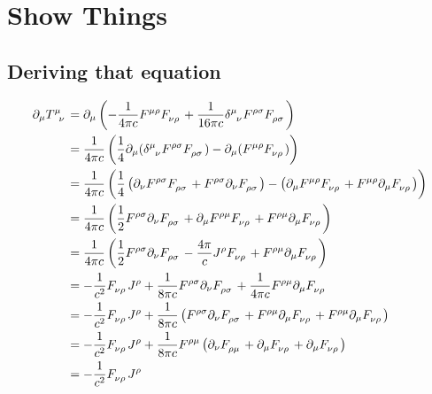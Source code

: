 \clearpage
\section{Show Things}
\subsection{Deriving that equation}

\begin{align}
	\partial_\mu\tensor{T}{^\mu_\nu} &= \partial_\mu\ins{-\frac{1}{4\pi c}\tensor{F}{^\mu^\rho}\tensor{F}{_\nu_\rho}+\frac{1}{16\pi c}\tensor{\delta}{^\mu_\nu}\tensor{F}{^\rho^\sigma}\tensor{F}{_\rho_\sigma}}\\
	&= \frac{1}{4\pi c}\ins{\frac{1}{4}\partial_\mu(\tensor{\delta}{^\mu_\nu}\tensor{F}{^\rho^\sigma}\tensor{F}{_\rho_\sigma})-\partial_\mu(\tensor{F}{^\mu^\rho}\tensor{F}{_\nu_\rho})}\\
	&= \frac{1}{4\pi c}\ins{\frac{1}{4}\ins{\partial_\nu\tensor{F}{^\rho^\sigma}\tensor{F}{_\rho_\sigma}+\tensor{F}{^\rho^\sigma}\partial_\nu\tensor{F}{_\rho_\sigma}}-\ins{\partial_\mu\tensor{F}{^\mu^\rho}\tensor{F}{_\nu_\rho}+\tensor{F}{^\mu^\rho}\partial_\mu\tensor{F}{_\nu_\rho}}}\\
	&= \frac{1}{4\pi c}\ins{\frac{1}{2}\tensor{F}{^\rho^\sigma}\partial_\nu\tensor{F}{_\rho_\sigma}+\partial_\mu\tensor{F}{^\rho^\mu}\tensor{F}{_\nu_\rho}+\tensor{F}{^\rho^\mu}\partial_\mu\tensor{F}{_\nu_\rho}}\\
	&= \frac{1}{4\pi c}\ins{\frac{1}{2}\tensor{F}{^\rho^\sigma}\partial_\nu\tensor{F}{_\rho_\sigma}-\frac{4\pi}{c}J^\rho\tensor{F}{_\nu_\rho}+\tensor{F}{^\rho^\mu}\partial_\mu\tensor{F}{_\nu_\rho}}\\
	&= -\frac{1}{c^2}\tensor{F}{_\nu_\rho}J^\rho+\frac{1}{8\pi c}\tensor{F}{^\rho^\sigma}\partial_\nu\tensor{F}{_\rho_\sigma}+\frac{1}{4\pi c}\tensor{F}{^\rho^\mu}\partial_\mu\tensor{F}{_\nu_\rho}\\
	&= -\frac{1}{c^2}\tensor{F}{_\nu_\rho}J^\rho+\frac{1}{8\pi c}\ins{\tensor{F}{^\rho^\sigma}\partial_\nu\tensor{F}{_\rho_\sigma}+\tensor{F}{^\rho^\mu}\partial_\mu\tensor{F}{_\nu_\rho}+\tensor{F}{^\rho^\mu}\partial_\mu\tensor{F}{_\nu_\rho}}\\
	&= -\frac{1}{c^2}\tensor{F}{_\nu_\rho}J^\rho+\frac{1}{8\pi c}\tensor{F}{^\rho^\mu}\ins{\partial_\nu\tensor{F}{_\rho_\mu}+\partial_\mu\tensor{F}{_\nu_\rho}+\partial_\mu\tensor{F}{_\nu_\rho}}\\
	&= -\frac{1}{c^2}\tensor{F}{_\nu_\rho}J^\rho
\end{align}
